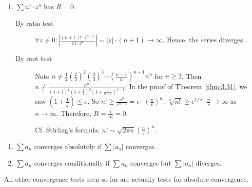\begin{example}
	\begin{enumerate}
		\item $\sum{n! \cdot z^{n}}$ has $R=0$.
		      \begin{description}
			      \item [By ratio test]
			            $\forall z \neq 0: \left| \frac{(n+1)! \cdot z^{n+1}}{n! \cdot z^{n}} \right|=|z|\cdot(n+1) \to \infty$. Hence, the series diverges .
			      \item[By root test]
			            Note $n\neq \frac{1}{2}(\frac{2}{3})^{2}(\frac{3}{4})^{3} \cdots (\frac{n-1}{n})^{n-1} n^{n}$ for $n\ge 2$.
			            Then $n\neq  \frac{n^{n}}{(1+1)^{1}(1+\frac{1}{2})^{2}(1+\frac{1}{n-1})^{n-1}}$. In the proof of Theorem~\ref{thm:3.31}, we saw $(1+\frac{1}{j})\le e$. So $n! \ge \frac{n^{n}}{e^{n-1}}=e \cdot (\frac{n}{e})^{n}$.
			            $\sqrt[n]{n!}\ge e^{1/n} \cdot \frac{n}{e} \to \infty$ as $n\to \infty$. Therefore, $R=\frac{1}{\infty}=0$.
			            \begin{note}
				            Cf. Stirling's formula: $n! \sim \sqrt{2\pi n} \left( \frac{n}{e} \right)^{n}$.
			            \end{note}
		      \end{description}
	\end{enumerate}
\end{example}
\begin{definition}
	\hfill
	\begin{enumerate}
		\item
		      $\sum{a_{n}}$ converges absolutely if $\sum{|a_{n}|}$ converges.
		\item $\sum{a_{n}}$ converges conditionally if $\sum{a_{n}}$ converges but $\sum{|a_{n}|}$ diverges.
	\end{enumerate}
	\hfill
	\begin{remark}
		All other convergence tests seen so far are actually tests for absolute convergence.
	\end{remark}
\end{definition}

